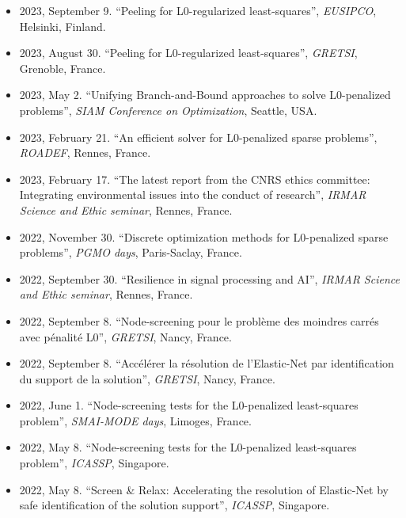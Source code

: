 \begin{itemize}
    \item 2023, September 9. ``Peeling for L0-regularized least-squares'', \textit{EUSIPCO}, Helsinki, Finland.
    \item 2023, August 30. ``Peeling for L0-regularized least-squares'', \textit{GRETSI}, Grenoble, France.
    \item 2023, May 2. ``Unifying Branch-and-Bound approaches to solve L0-penalized problems'', \textit{SIAM Conference on Optimization}, Seattle, USA.
    \item 2023, February 21. ``An efficient solver for L0-penalized sparse problems'', \textit{ROADEF}, Rennes, France.
    \item 2023, February 17. ``The latest report from the CNRS ethics committee: Integrating environmental issues into the conduct of research'', \textit{IRMAR Science and Ethic seminar}, Rennes, France.
    \item 2022, November 30. ``Discrete optimization methods for L0-penalized sparse problems'', \textit{PGMO days}, Paris-Saclay, France.
    \item 2022, September 30. ``Resilience in signal processing and AI'', \textit{IRMAR Science and Ethic seminar}, Rennes, France.
    \item 2022, September 8. ``Node-screening pour le problème des moindres carrés avec pénalité L0'', \textit{GRETSI}, Nancy, France.
    \item 2022, September 8. ``Accélérer la résolution de l’Elastic-Net par identification du support de la solution'', \textit{GRETSI}, Nancy, France.
    \item 2022, June 1. ``Node-screening tests for the L0-penalized least-squares problem'', \textit{SMAI-MODE days}, Limoges, France.
    \item 2022, May 8. ``Node-screening tests for the L0-penalized least-squares problem'', \textit{ICASSP}, Singapore.
    \item 2022, May 8. ``Screen \& Relax: Accelerating the resolution of Elastic-Net by safe identification of the solution support'', \textit{ICASSP}, Singapore.
\end{itemize}